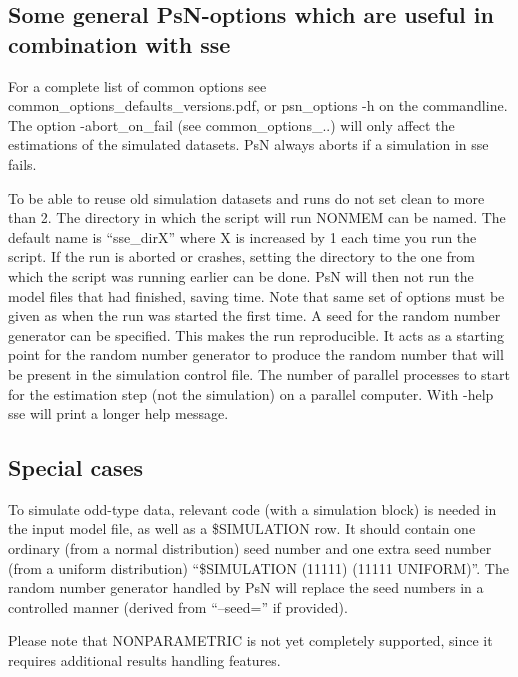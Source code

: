 \subsection{Some general PsN-options which are useful in combination with sse }
For a complete list of common options see common\_options\_defaults\_versions.pdf, or psn\_options -h on the commandline. The option -abort\_on\_fail (see common\_options\_..) will only affect the estimations of the simulated datasets. PsN always aborts if a simulation in sse fails.

\begin{optionlist}
To be able to reuse old simulation datasets and runs do not set clean to more than 2. 
\nextopt
{}
The directory in which the script will run NONMEM can be named. The default name is “sse\_dirX” where X is increased by 1 each time you run the script. If the run is aborted or crashes, setting the directory to the one from which the script was running earlier can be done. PsN will then not run the model files that had finished, saving time. Note that same set of options must be given as when the run was started the first time. 
\nextopt
{}
A seed for the random number generator can be specified. This makes the run reproducible. It acts as a starting point for the random number generator to produce the random number that will be present in the simulation control file. 
\nextopt
{}
The number of parallel processes to start for the estimation step (not the simulation) on a parallel computer. 
\nextopt
{}
With -help sse will print a longer help message. 
\nextopt
\end{optionlist}


\subsection{Special cases}
To simulate odd-type data, relevant code (with a simulation block) is needed in the input model file, as well as a \$SIMULATION row. It should contain one ordinary (from a normal distribution) seed number and one extra seed number (from a uniform distribution) “\$SIMULATION (11111) (11111 UNIFORM)”. The random number generator handled by PsN will replace the seed numbers in a controlled manner (derived from “–seed=” if provided).

Please note that NONPARAMETRIC is not yet completely supported, since it requires additional results handling features.

